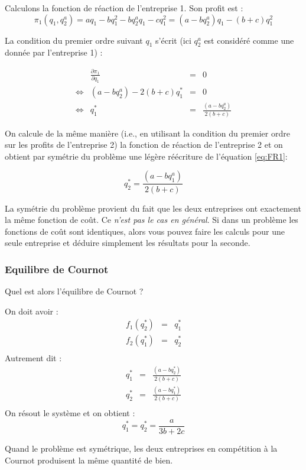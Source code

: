 \documentclass[
]{book}
\theoremstyle{definition}
\theoremstyle{definition}
\theoremstyle{definition}
\theoremstyle{definition}
\theoremstyle{remark}
\begin{document}
Calculons la fonction de réaction de l'entreprise 1.
Son profit est :
\[
\pi_1(q_1, q_2^a) = aq_1-bq_1^2-bq_2^aq_1-cq_1^2 = (a-bq_2^a)q_1-(b+c)q_1^2
\]

La condition du premier ordre suivant \(q_1\) s'écrit (ici \(q_2^a\) est considéré comme une donnée par l'entreprise 1) :

\[
\begin{array}{crcl}
&\frac{\partial \pi_1}{\partial q_1}&=&0\\
\Leftrightarrow & (a-bq_2^a)-2(b+c)q_1^* &=& 0\\
\Leftrightarrow & q_1^* &=& \frac{(a-bq_2^a)}{2(b+c)}
\label{eq:FR1}
\end{array}
\]

On calcule de la même manière (i.e., en utilisant la condition du premier ordre sur les profits de l'entreprise 2) la fonction de réaction de l'entreprise 2 et on obtient par symétrie du problème une légère réécriture de l'équation \eqref{eq:FR1}:

\[
q_2^* = \frac{(a-bq_1^a)}{2(b+c)}
\]

La symétrie du problème provient du fait que les deux entreprises ont exactement la même fonction de coût.
Ce \emph{n'est pas le cas en général}.
Si dans un problème les fonctions de coût sont identiques, alors vous pouvez faire les calculs pour une seule entreprise et déduire simplement les résultats pour la seconde.

\hypertarget{equilibre-de-cournot}{%
\subsubsection{Equilibre de Cournot}\label{equilibre-de-cournot}}

Quel est alors l'équilibre de Cournot ?

On doit avoir :
\[
\begin{array}{rcl}
f_1(q_2^*) &=& q_1^*\\
f_2(q_1^*) &=& q_2^*\\
\end{array}
\]
Autrement dit :
\[
\begin{array}{rcl}
q_1^* &=& \frac{(a-bq_2^*)}{2(b+c)} \\
q_2^* &=&\frac{(a-bq_1^*)}{2(b+c)}\\
\end{array}
\]
On résout le système et on obtient :
\[
q_1^*=q_2^* = \frac{a}{3b+2c}
\]

Quand le problème est symétrique, les deux entreprises en compétition à la Cournot produisent la même quantité de bien.
\end{document}
